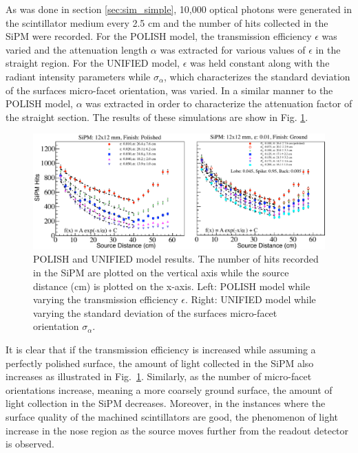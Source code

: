 As was done in section \ref{sec:sim_simple}, 10,000 optical photons were generated in the scintillator medium every 2.5 cm and the number of hits collected in the SiPM were recorded.  For the POLISH model, the transmission efficiency $\epsilon$ was varied and the attenuation length $\alpha$ was extracted for various values of $\epsilon$ in the straight region.  For the UNIFIED model, $\epsilon$ was held constant along with the radiant intensity parameters while $\sigma_{\alpha}$, which characterizes the standard deviation of the surfaces micro-facet orientation, was varied.  In a similar manner to the POLISH model, $\alpha$ was extracted in order to characterize the attenuation factor of the straight section.  The results of these simulations are show in Fig. \ref{fig:transm_eff_vs_sig_alpha}.
	\begin{figure}[!htb]
	\centering
	\includegraphics[width=1.0\textwidth]{simulation/figs/transm_eff_vs_sig_alpha_v2.pdf}
	\caption{POLISH and UNIFIED model results.  The number of hits recorded in the SiPM are plotted on the vertical axis while  the source distance (cm) is plotted on the x-axis.  Left: POLISH model while varying the transmission efficiency $\epsilon$.  Right: UNIFIED model while varying the standard deviation of the surfaces micro-facet orientation $\sigma_{\alpha}$.}
	\label{fig:transm_eff_vs_sig_alpha}
	\end{figure}

It is clear that if the transmission efficiency is increased while assuming a perfectly polished surface, the amount of light collected in the SiPM also increases as illustrated in Fig.~\ref{fig:transm_eff_vs_sig_alpha}.  Similarly, as the number of micro-facet orientations increase, meaning a more coarsely ground surface, the amount of light collection in the SiPM decreases.  Moreover, in the instances where the surface quality of the machined scintillators are good, the phenomenon of light increase in the nose region as the source moves further from the readout detector is observed.